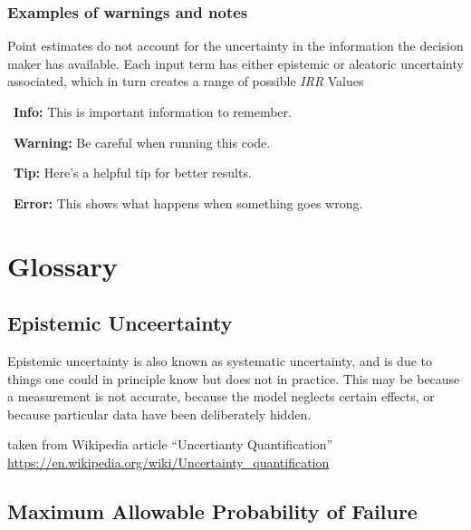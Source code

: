 \documentclass[
]{article}
\begin{document}
\subsubsection{Examples of warnings and notes}\label{examples-of-warnings-and-notes}

Point estimates do not account for the uncertainty in the information the decision maker has available. Each input term has either epistemic or aleatoric uncertainty associated, which in turn creates a range of possible \textit{IRR} Values

\begin{infobox}
\faInfoCircle\ \textbf{Info:} This is important information to remember.
\end{infobox}

\begin{warningbox}
\faExclamationTriangle\ \textbf{Warning:} Be careful when running this code.
\end{warningbox}

\begin{tipbox}
\faLightbulb\ \textbf{Tip:} Here's a helpful tip for better results.
\end{tipbox}

\begin{errorbox}
\faTimesCircle\ \textbf{Error:} This shows what happens when something goes wrong.
\end{errorbox}

\section{Glossary}\label{glossary}

\subsection{Epistemic Unceertainty}\label{epistemic-unceertainty}

Epistemic uncertainty is also known as systematic uncertainty, and is due to things one could in principle know but does not in practice. This may be because a measurement is not accurate, because the model neglects certain effects, or because particular data have been deliberately hidden.

taken from Wikipedia article ``Uncertianty Quantification'' \url{https://en.wikipedia.org/wiki/Uncertainty_quantification}

\subsection{Maximum Allowable Probability of Failure}\label{maximum-allowable-probability-of-failure}
\end{document}
